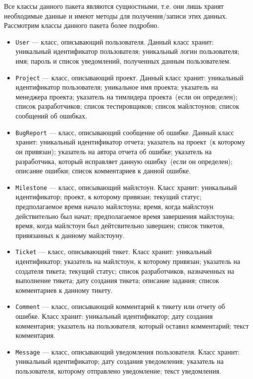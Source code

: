 Все классы данного пакета являются сущностными, т.е. они лишь хранят необходимые данные и имеют методы для получения/записи этих данных. Рассмотрим классы данного пакета более подробно.
\begin{itemize}
\item \texttt{User} --- класс, описывающий пользователя. Данный класс хранит: уникальный идентификатор пользователя; уникальный логин пользователя; имя; пароль и список уведомлений, полученных данным пользователем.

\item \texttt{Project} --- класс, описывающий проект. Данный класс хранит: уникальный идентификатор пользователя; уникальное имя проекта; указатель на менеджера проекта; указатель на тимлидера проекта~(если он определен); список разработчиков; список тестировщиков; список майлстоунов; список сообщений об ошибках.

\item \texttt{BugReport} --- класс, описывающий сообщение об ошибке. Данный класс хранит: уникальный идентификатор отчета; указатель на проект~(к которому он привязан); указатель на автора отчета об ошибке; указатель на разработчика, который исправляет данную ошибку~(если он определен); описание ошибки; список комментариев к данной ошибке.

\item \texttt{Milestone} --- класс, описывающий майлстоун. Класс хранит: уникальный идентификатор; проект, к которому привязан; текущий статус; предполагаемое время начало майлстоуна; время, когда майлстоун действительно был начат; предполагаемое время завершения майлстоуна; время, когда майлстоун был дейтсвительно завершен; список тикетов, привязанных к данному майлстоуну.

\item \texttt{Ticket} --- класс, описывающий тикет. Класс хранит: уникальный идентификатор; указатель на майлстоун, к которому привязан; указатель на создателя тикета; текущий статус; список разработчиков, назначенных на выполнение тикета; дату создания тикета; описание задания; список комментариев к данному тикету.

\item \texttt{Comment} --- класс, описывающий комментарий к тикету или отчету об ошибке. Класс хранит: уникальный идентификатор; дату создания комментария; указатель на пользователя, который оставил комментарий; текст комментария.

\item \texttt{Message} --- класс, описывающий уведомления пользователя. Класс хранит: уникальный идентификатор; дату создания уведомления; указатель на пользователя, которому отправлено уведомление; текст уведомления.
\end{itemize}

